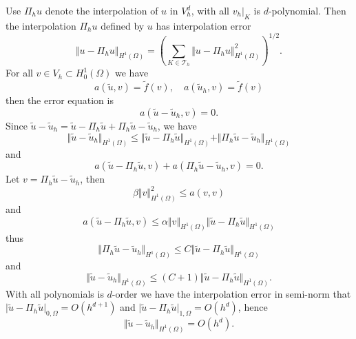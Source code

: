 \documentclass[11pt,letterpaper]{article}
\begin{document}
Use $\Pi_h u$ denote the interpolation of $u$ in $V_h^d$,
with all $v_h|_K$ is $d$-polynomial.
Then the interpolation $\Pi_h u$ defined by $u$ has interpolation error
\begin{displaymath}
  \Vert u-\Pi _hu\Vert _{H^1(\Omega)}
  =\left (\sum_{K\in \mathscr{T}_h}\Vert u-\Pi_h u\Vert^2_{H^1(\Omega)}\right)^{1/2}.
\end{displaymath}
For all $v\in V_h\subset H_0^1(\Omega)$ we have
\begin{displaymath}
  a(\tilde u,v)=\tilde f(v),\quad a(\tilde u_h,v)= \tilde f(v)
\end{displaymath}
then the error equation is 
\begin{displaymath}
  a(\tilde u-\tilde u_h,v)=0.
\end{displaymath}
Since $\tilde u-\tilde u_h= \tilde u-\Pi_h \tilde u +\Pi_h \tilde u-\tilde u_h$, we have
\begin{displaymath}
  \Vert \tilde u-\tilde u_h\Vert_{H^1(\Omega)}
  \leq \Vert \tilde u-\Pi_h \tilde u\Vert_{H^1(\Omega)}  +\Vert\Pi_h \tilde u-\tilde u_h\Vert_{H^1(\Omega)}
\end{displaymath}
and
\begin{displaymath}
  a(\tilde u-\Pi_h \tilde u,v)+a(\Pi_h \tilde u-\tilde u_h,v)=0.
\end{displaymath}
Let $v=\Pi_h \tilde u -\tilde u_h$, then 
$$\beta \Vert v\Vert_{H^1(\Omega)}^2\leq a(v,v)$$
and 
\begin{displaymath}
  a(\tilde u-\Pi_h \tilde u,v)\leq
  \alpha \Vert v\Vert _{H^1(\Omega)}
  \Vert \tilde u-\Pi_h \tilde u\Vert _{H^1(\Omega)}
\end{displaymath}
thus
\begin{displaymath}
  \Vert \Pi_h \tilde u -\tilde u_h\Vert _{H^1(\Omega)}
  \leq C\Vert \tilde u-\Pi_h \tilde u\Vert _{H^1(\Omega)}
\end{displaymath}
and
\begin{displaymath}
   \Vert \tilde u-\tilde u_h\Vert_{H^1(\Omega)}\leq (C+1)\Vert \tilde u-\Pi_h \tilde u\Vert _{H^1(\Omega)}.
 \end{displaymath}
 With all polynomials is $d$-order we have the interpolation error in semi-norm that
 $\vert \tilde u-\Pi_h \tilde u\vert _{0,\Omega}=O(h^{d+1})$
 and $\vert \tilde u-\Pi_h \tilde u\vert _{1,\Omega}=O(h^d)$,
 hence
 \begin{displaymath}
   \Vert \tilde u-\tilde u_h\Vert_{H^1(\Omega)}=O(h^d).
 \end{displaymath}
 
\end{document}
